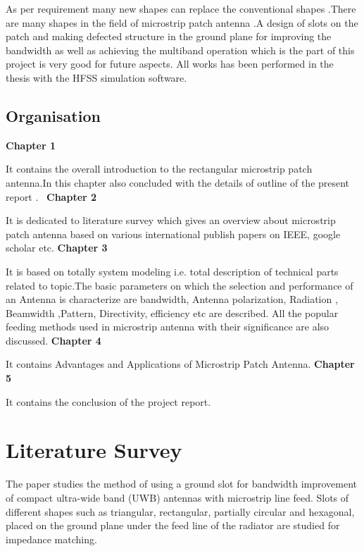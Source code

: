 \documentclass[12pt]{article}
\begin{document}
 \justify
   As per requirement many new shapes can replace the conventional shapes .There are many shapes in the field of microstrip patch antenna .A design of slots on the patch and making defected structure in the ground plane for improving the bandwidth as well as achieving the multiband operation which is the part of this project is very good for future aspects. All works has been performed in the thesis with the HFSS simulation software.

\cleardoublepage


\subsection{Organisation}\label{sub:Organisation}
 \justify
  \textbf{Chapter 1}

      It contains the overall introduction to the rectangular microstrip patch antenna.In this chapter also concluded with the details of outline of the present report .\
 \justify
  \textbf{Chapter 2}

      It is dedicated to literature survey which gives an overview about microstrip patch antenna based on various international publish papers on IEEE, google scholar etc.
 \justify
  \textbf{Chapter 3}

      It is based on totally system modeling i.e. total description of technical parts related to topic.The basic parameters on which the selection and performance of an Antenna is characterize are bandwidth, Antenna polarization, Radiation , Beamwidth ,Pattern, Directivity, efficiency etc are described. All the popular feeding methods used in microstrip antenna with their significance are also discussed.
 \justify
  \textbf{Chapter 4}

      It contains Advantages and Applications of Microstrip Patch Antenna.
 \justify
  \textbf{Chapter 5}

      It contains the conclusion of the project report.
\cleardoublepage
\section{Literature Survey}\label{sec:Literature Survey}
\justify
	The paper studies the method of using a ground slot for bandwidth improvement of compact ultra-wide band (UWB) antennas 	with microstrip line feed. Slots of different shapes such as triangular, rectangular, partially circular and hexagonal, placed on the ground plane under the feed line of the radiator are studied for impedance matching. \\
\end{document}
